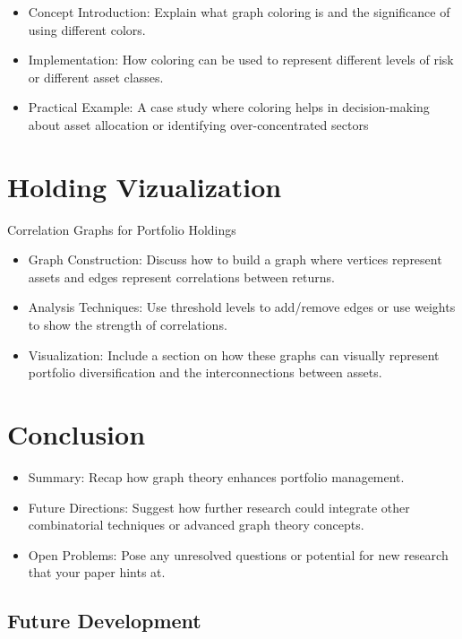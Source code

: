 \documentclass{article}
\begin{document}
\begin{itemize}
    \item Concept Introduction: Explain what graph coloring is and the significance of using different colors.
    \item Implementation: How coloring can be used to represent different levels of risk or different asset classes.
    \item Practical Example: A case study where coloring helps in decision-making about asset allocation or identifying over-concentrated sectors
\end{itemize}


\section{Holding Vizualization}

Correlation Graphs for Portfolio Holdings

\begin{itemize}
    \item Graph Construction: Discuss how to build a graph where vertices represent assets and edges represent correlations between returns.
    \item Analysis Techniques: Use threshold levels to add/remove edges or use weights to show the strength of correlations.
    \item Visualization: Include a section on how these graphs can visually represent portfolio diversification and the interconnections between assets.
\end{itemize}


\section{Conclusion}

\begin{itemize}
    \item Summary: Recap how graph theory enhances portfolio management.
    \item Future Directions: Suggest how further research could integrate other combinatorial techniques or advanced graph theory concepts.
    \item Open Problems: Pose any unresolved questions or potential for new research that your paper hints at.
\end{itemize}


\subsection{Future Development}
\end{document}
